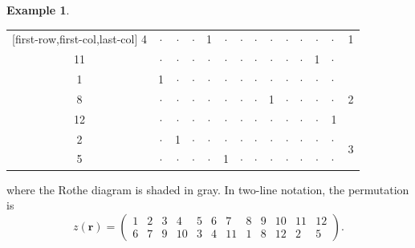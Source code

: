 \documentclass[reqno]{amsart}
\numberwithin{equation}{section}
\theoremstyle{definition}
\newtheorem{example}[theorem]{Example}
\theoremstyle{remark}
\begin{document}
\begin{example}
\begin{center}
\begin{NiceTabular}{|cc|ccc|ccc|cccc|}[first-row,first-col,last-col]
        4 &$\cdot$ & $\cdot$ & $\cdot$ & 1 & $\cdot$ & $\cdot$ & $\cdot$ & $\cdot$ & $\cdot$ & $\cdot$ & $\cdot$ & $\cdot$&1\\
        11 &$\cdot$ & $\cdot$ & $\cdot$ & $\cdot$ & $\cdot$ & $\cdot$ & $\cdot$ & $\cdot$ & $\cdot$ & $\cdot$ & 1 & $\cdot$&\\ &1 & $\cdot$ & $\cdot$ & $\cdot$ & $\cdot$ & $\cdot$ & $\cdot$ & $\cdot$ & $\cdot$ & $\cdot$ & $\cdot$ & $\cdot$&\\
        8 &$\cdot$ & $\cdot$ & $\cdot$ & $\cdot$ & $\cdot$ & $\cdot$ & $\cdot$ & 1 & $\cdot$ & $\cdot$ & $\cdot$ & $\cdot$&2\\
        12 &$\cdot$ & $\cdot$ & $\cdot$ & $\cdot$ & $\cdot$ & $\cdot$ & $\cdot$ & $\cdot$ & $\cdot$ & $\cdot$ & $\cdot$ & 1&\\ &$\cdot$ & 1 & $\cdot$ & $\cdot$ & $\cdot$ & $\cdot$ & $\cdot$ & $\cdot$ & $\cdot$ & $\cdot$ & $\cdot$ & $\cdot$&\\
        5 &$\cdot$ & $\cdot$ & $\cdot$ & $\cdot$ & 1 & $\cdot$ & $\cdot$ & $\cdot$ & $\cdot$ & $\cdot$ & $\cdot$ & $\cdot$\\\hline
    \end{NiceTabular}
\end{center}
where the Rothe diagram is shaded in gray. In two-line notation, the permutation is
\[z(\mathbf{r})=\begin{pmatrix}
    1&2&3&4&5&6&7&8&9&10&11&12\\
    6&7&9&10&3&4&11&1&8&12&2&5
\end{pmatrix}.\]
\end{example}
\end{document}
